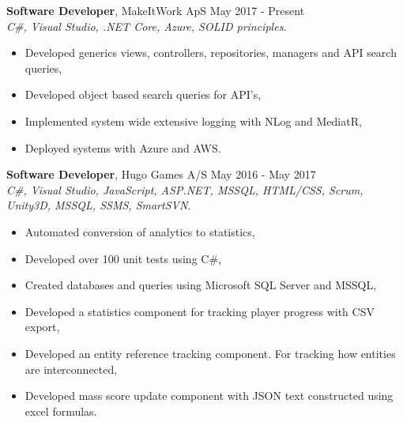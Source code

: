 \documentclass[margin, 10pt, hidelinks]{res} %
\newcommand{\emphasize}{\large\bfseries} %
\begin{document}
\begin{resume}
{\emphasize Software Developer}, MakeItWork ApS  \hfill May 2017 - Present  \\
{\it C\#, Visual Studio, .NET Core, Azure, SOLID principles. } %
\begin{itemize} \setlength{\itemindent}{-0.1in}\itemsep 0pt %
\item Developed generics views, controllers, repositories, managers and API search queries,
\item Developed object based search queries for API's,
\item Implemented system wide extensive logging with NLog and MediatR,
\item Deployed systems with Azure and AWS. 
\end{itemize}

{\emphasize Software Developer}, Hugo Games A/S  \hfill May 2016 - May 2017  \\
{\it C\#, Visual Studio, JavaScript, ASP.NET, MSSQL, HTML/CSS, Scrum, Unity3D, MSSQL, SSMS, SmartSVN.} %
\begin{itemize} \setlength{\itemindent}{-0.1in}\itemsep 0pt %
\item Automated conversion of analytics to statistics,
\item Developed over 100 unit tests using C\#,
\item Created databases and queries using Microsoft SQL Server and MSSQL,
\item Developed a statistics component for tracking player progress with CSV export,
\item Developed an entity reference tracking component. For tracking how entities are interconnected,
\item Developed mass score update component with JSON text constructed using excel formulas.
\end{itemize}




\end{resume}
\end{document}
